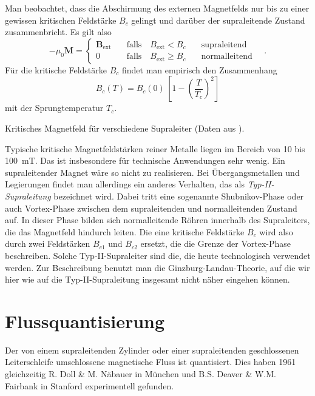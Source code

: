 Man beobachtet, dass die Abschirmung des externen Magnetfelds nur bis zu einer gewissen kritischen Feldstärke $B_c$ gelingt und darüber der supraleitende Zustand zusammenbricht. Es gilt also 
\begin{equation}
    - \mu_0 \bm{M} = 
    \left\{
    \begin{matrix}
    \bm{B}_\text{ext} \quad & \text{falls} \quad {B}_\text{ext}  < B_c & \quad \text{supraleitend} \\
    0    & \text{falls} \quad {B}_\text{ext}  \ge B_c  & \quad \text{normalleitend}
\end{matrix}
    \right. \quad .
\end{equation} 
Für die kritische Feldstärke $B_c$ findet man empirisch den Zusammenhang
\begin{equation}
    B_c(T) = B_c(0) \, \left[ 1 - \left( \frac{T}{T_c} \right)^2 \right]
\end{equation}
mit der Sprungtemperatur $T_c$.


\begin{marginfigure}
    \caption{Kritisches Magnetfeld für verschiedene Supraleiter (Daten aus  \cite{Hunklinger2014}).}
\end{marginfigure}


Typische kritische Magnetfeldstärken reiner Metalle liegen im Bereich von 10 bis 100~mT. Das ist insbesondere für technische Anwendungen sehr wenig. Ein supraleitender Magnet wäre so nicht zu realisieren. Bei Übergangsmetallen und Legierungen findet man allerdings ein anderes Verhalten, das als \emph{Typ-II-Supraleitung} bezeichnet wird. Dabei tritt eine sogenannte Shubnikov-Phase oder auch Vortex-Phase zwischen dem supraleitenden und normalleitenden Zustand auf. In dieser Phase bilden sich normalleitende Röhren innerhalb des Supraleiters, die das Magnetfeld hindurch leiten. Die eine kritische Feldstärke $B_c$ wird also durch zwei Feldstärken $B_{c1}$ und  $B_{c2}$ ersetzt, die die Grenze der Vortex-Phase beschreiben. Solche Typ-II-Supraleiter sind die, die heute technologisch verwendet werden.  Zur Beschreibung benutzt man die Ginzburg-Landau-Theorie, auf die wir hier wie auf die Typ-II-Supraleitung insgesamt nicht näher eingehen können.



\section{Flussquantisierung}

Der von einem supraleitenden Zylinder oder einer supraleitenden geschlossenen Leiterschleife umschlossene magnetische Fluss ist quantisiert. Dies haben 1961 gleichzeitig R. Doll \& M. Näbauer in München und B.S. Deaver \& W.M. Fairbank in Stanford experimentell gefunden.

